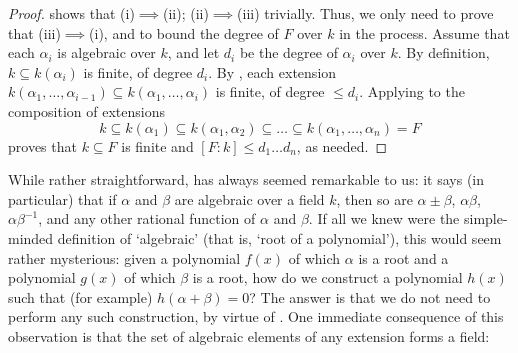 \begin{proof}
   shows that (i)$\implies$(ii);
  (ii)$\implies$(iii) trivially. Thus, we only need to prove that
  (iii)$\implies$(i), and to bound the degree of $F$ over $k$ in the
  process.  Assume that each $\alpha_i$ is algebraic over $k$, and let
  $d_i$ be the degree of $\alpha_i$ over $k$. By definition,
  $k \subseteq k(\alpha_i)$ is finite, of degree $d_i$. By
  , each extension
  $k(\alpha_1, \dots, \alpha_{i-1}) \subseteq k(\alpha_1, \dots,
  \alpha_i)$ is finite, of degree $\leq d_i$. Applying
   to the composition of extensions
  \[
    k \subseteq k(\alpha_1) \subseteq k(\alpha_1, \alpha_2) \subseteq
    \dots \subseteq k(\alpha_1, \dots, \alpha_n) = F
  \]
  proves that $k \subseteq F$ is finite and
  $[F : k] \leq d_1 \dots d_n$, as needed.
\end{proof}
While rather straightforward,  has always
seemed remarkable to us: it says (in particular) that if $\alpha$ and
$\beta$ are algebraic over a field $k$, then so are
$\alpha \pm \beta$, $\alpha\beta$, $\alpha\beta^{-1}$, and any other
rational function of $\alpha$ and $\beta$.  If all we knew were the
simple-minded definition of `algebraic' (that is, `root of a
polynomial'), this would seem rather mysterious: given a polynomial
$f(x)$ of which $\alpha$ is a root and a polynomial $g(x)$ of which
$\beta$ is a root, how do we construct a polynomial $h(x)$ such that
(for example) $h(\alpha + \beta) = 0$? The answer is that we do not
need to perform any such construction, by virtue of
.  One immediate consequence of this
observation is that the set of algebraic elements of any extension
forms a field:

